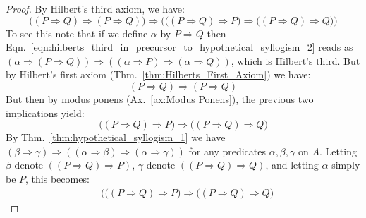     \begin{proof}
        By Hilbert's third axiom, we have:
        \begin{equation}
            \label{eqn:hilberts_third_in_precursor_to_hypothetical_syllogism_2}%
            \big(
                (P\Rightarrow{Q})\Rightarrow(P\Rightarrow{Q})
            \big)
            \Rightarrow
            \Big(
                \big(
                    (P\Rightarrow{Q})\Rightarrow{P}
                \big)
                \Rightarrow
                \big(
                    (P\Rightarrow{Q})\Rightarrow{Q}
                \big)
            \Big)
        \end{equation}
        To see this note that if we define $\alpha$ by $P\Rightarrow{Q}$ then
        Eqn.~\ref{eqn:hilberts_third_in_precursor_to_hypothetical_syllogism_2}
        reads as
        $(\alpha\Rightarrow(P\Rightarrow{Q}))\Rightarrow%
         ((\alpha\Rightarrow{P})\Rightarrow(\alpha\Rightarrow{Q}))$,
        which is Hilbert's third. But by Hilbert's first axiom
        (Thm.~\ref{thm:Hilberts_First_Axiom}) we have:
        \begin{equation}
            (P\Rightarrow{Q})\Rightarrow(P\Rightarrow{Q})
        \end{equation}
        But then by modus ponens (Ax.~\ref{ax:Modus Ponens}), the previous two
        implications yield:
        \begin{equation}
            \label{eqn:eqn2_precursor_to_hypothetical_syllogism_2}%
            \big(
                (P\Rightarrow{Q})\Rightarrow{P}
            \big)
            \Rightarrow
            \big(
                (P\Rightarrow{Q})\Rightarrow{Q}
            \big)
        \end{equation}
        By Thm.~\ref{thm:hypothetical_syllogism_1} we have
        $(\beta\Rightarrow\gamma)\Rightarrow%
         ((\alpha\Rightarrow\beta)\Rightarrow(\alpha\Rightarrow\gamma))$ for any
        predicates $\alpha,\beta,\gamma$ on $A$. Letting $\beta$ denote
        $((P\Rightarrow{Q})\Rightarrow{P})$, $\gamma$ denote
        $((P\Rightarrow{Q})\Rightarrow{Q})$, and letting $\alpha$ simply be $P$,
        this becomes:
        \begin{equation}
            \begin{split}
                &
                \Big(
                    \big(
                        (P\Rightarrow{Q})\Rightarrow{P}
                    \big)\Rightarrow
                    \big(
                        (P\Rightarrow{Q})\Rightarrow{Q}
                    \big)

\end{split}
\end{equation}
\end{proof}
